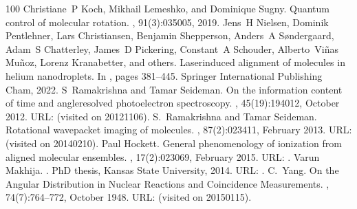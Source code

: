 \documentclass[letterpaper,table,10pt,english]{jupyterBook}
\begin{document}
\begin{sphinxthebibliography}{100}
\sphinxAtStartPar
Christiane P Koch, Mikhail Lemeshko, and Dominique Sugny. Quantum control of molecular rotation. , 91(3):035005, 2019.
\sphinxAtStartPar
Jens H Nielsen, Dominik Pentlehner, Lars Christiansen, Benjamin Shepperson, Anders A Søndergaard, Adam S Chatterley, James D Pickering, Constant A Schouder, Alberto Viñas Muñoz, Lorenz Kranabetter, and others. Laser\sphinxhyphen{}induced alignment of molecules in helium nanodroplets. In , pages 381–445. Springer International Publishing Cham, 2022.
\sphinxAtStartPar
S Ramakrishna and Tamar Seideman. On the information content of time\sphinxhyphen{} and angle\sphinxhyphen{}resolved photoelectron spectroscopy. , 45(19):194012, October 2012. URL:  (visited on 2012\sphinxhyphen{}11\sphinxhyphen{}06).
\sphinxAtStartPar
S. Ramakrishna and Tamar Seideman. Rotational wave\sphinxhyphen{}packet imaging of molecules. , 87(2):023411, February 2013. URL:  (visited on 2014\sphinxhyphen{}02\sphinxhyphen{}10).
\sphinxAtStartPar
Paul Hockett. General phenomenology of ionization from aligned molecular ensembles. , 17(2):023069, February 2015. URL: .
\sphinxAtStartPar
Varun Makhija. . PhD thesis, Kansas State University, 2014. URL: .
\sphinxAtStartPar
C. Yang. On the Angular Distribution in Nuclear Reactions and Coincidence Measurements. , 74(7):764–772, October 1948. URL:  (visited on 2015\sphinxhyphen{}01\sphinxhyphen{}15).

\end{sphinxthebibliography}
\end{document}
